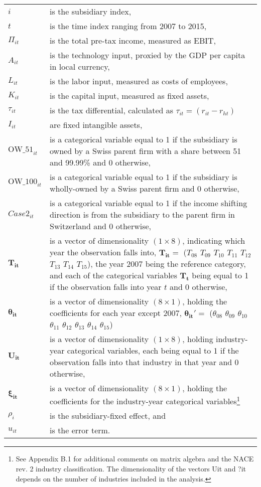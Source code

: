 \documentclass[10pt,twocolumn,oneside,cmyk]{article}
\begin{document}
\begin{supertabular}{p{0.07\textwidth} p{0.37\textwidth}}
 $i$ & is the subsidiary index,\\
 $t$&is the time index ranging from 2007 to 2015,\\
 $\Pi_{it}$&is the total pre-tax income, measured as EBIT,\\
 $A_{it}$&is the technology input, proxied by the GDP per capita in local currency,\\
 $L_{it}$&is the labor input, measured as costs of employees,\\
 $K_{it}$&is the capital input, measured as fixed assets,\\
 $\tau_{it}$&is the tax differential, calculated as $\tau_{it}=(r_{it}-r_{ht})$\\
 $I_{it}$& are fixed intangible assets,\\
 $\text{OW\_51}_{it}$ &is a categorical variable equal to 1 if the subsidiary is owned by a Swiss parent firm with a share between 51 and 99.99\% and 0 otherwise,\\
 $\text{OW\_100}_{it}$ &is a categorical variable equal to 1 if the subsidiary is wholly-owned by a Swiss parent firm and 0 otherwise,\\
 $Case2_{it}$&is a categorical variable equal to 1 if the income shifting direction is from the subsidiary to the parent firm in Switzerland and 0 otherwise,\\
 $\bm{T_{it}}$&is a vector of dimensionality $(1\times8)$, indicating which year the observation falls into, $\bm{T_{it}}=$ ($T_{08}$ $T_{09}$ $T_{10}$ $T_{11}$ $T_{12}$ $T_{13}$ $T_{14}$ $T_{15}$), the year 2007 being the reference category, and each of the categorical variables $\bm{T_t}$ being equal to 1 if the observation falls into year $t$ and 0 otherwise,\\
 $\bm{\theta_{it}}$&is a vector of dimensionality $(8\times1)$, holding the coefficients for each year except 2007, $\bm{\theta_{it}}'=$ ($\theta_{08}$ $\theta_{09}$ $\theta_{10}$ $\theta_{11}$ $\theta_{12}$ $\theta_{13}$ $\theta_{14}$ $\theta_{15} $)\\
 $\bm{U_{it}}$&is a vector of dimensionality $(1\times8)$, holding industry-year categorical variables, each being equal to 1 if the observation falls into that industry in that year and 0 otherwise,\\
 $\bm{\xi_{it}}$&is a vector of dimensionality $(8\times1)$, holding the coefficients for the industry-year categorical variables\footnote{See Appendix B.1 for additional comments on matrix algebra and the NACE rev. 2 industry classification. The dimensionality of the vectors Uit and ?it depends on the number of industries included in the analysis.}\\
 $\rho_i$&is the subsidiary-fixed effect, and\\
 $u_{it}$& is the error term.\\
\end{supertabular}
\vspace{0.5cm}
\end{document}
